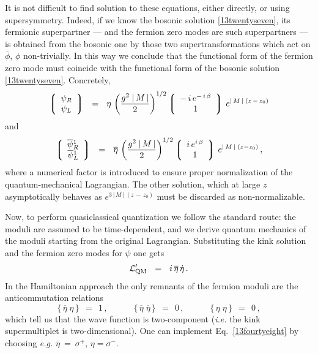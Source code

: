\documentclass[epsfig,12pt]{article}
\def\beq{\begin{equation}}
\def\eeq{\end{equation}}
\def\beq{\begin{equation}}
\def\eeq{\end{equation}}
\newcommand{\ov}{\overline}
\newcommand{\lgr}{\left\lgroup}
\newcommand{\rgr}{\right\rgroup}
\newcommand{\bpsi}{\ov{\psi}{}}
\newcommand{\bphi}{\ov{\phi}{}}
\begin{document}
	It is not difficult to find solution to these 
	equations, either directly, or using supersymmetry.
	Indeed, if we know the bosonic solution \eqref{13twentyseven},
	its fermionic superpartner --- and the fermion zero modes are such 
	superpartners --- is obtained from the
	bosonic one by those two supertransformations which act on
	$ \bphi $, $ \phi $ non-trivially.
	In this way we conclude that the
	functional form of the fermion zero mode 
	must coincide  with the functional form of the bosonic  
	solution \eqref{13twentyseven}. 
	Concretely,
\beq
	\lgr
		\begin{array}{c}
			\psi_R  \\  
			\psi_L
		\end{array}
	\rgr  ~~=~~ 
	\eta \,
	\left( \frac{g^2\; |\, M\,|}{2} \right)^{1/2}
	\lgr 
		\begin{array}{c}
			-\,i\,e^{-\,i\,\beta}  \\
			1
		\end{array}
	\rgr  \,e^{|\, M \,|\; (z \,-\, z_0)}
\label{13fourtyfive}
\eeq
	and
 \beq
	\lgr
		\begin{array}{c}
			\bpsi_R^1  \\
			\bpsi_L^1
		\end{array}
	\rgr  ~~=~~  
	\ov{\eta}\, \left( \frac{g^2\; |\, M \,|}{2} \right)^{1/2} 
	\lgr
		\begin{array}{c}
			i\, e^{i\, \beta}  \\
			1
		\end{array}
	\rgr  \,e^{|\, M \,|\; (z-z_0)}\,,
\label{13fourtysix}
\eeq
	where a numerical factor is introduced to ensure proper
	normalization of the quantum-mechanical Lagrangian.
	The other solution, which at large $ z $ asymptotically behaves
	as $ e^{3\, |\, M \,|\; (z \,-\, z_0)} $ must be discarded as non-normalizable.

	Now, to
	perform   quasiclassical quantization we follow the standard route:
	the moduli are assumed to be   time-dependent, and we derive 
	quantum mechanics of the moduli starting from the original Lagrangian.
	Substituting the kink solution and the fermion zero modes for
	$ \psi $ one gets
\beq
	{\cal L}'_{\rm QM}  ~~=~~ i\, \ov{\eta}\, \dot\eta\,.
\label{13fourtyseven}
\eeq
	In the Hamiltonian approach the only remnants of the fermion moduli
	are the anticommutation relations
\beq
	\{\, \ov{\eta}\; \eta \,\}  ~~=~~  1\,,\qquad\quad
	\{\, \ov{\eta}\; \ov{\eta} \,\}  ~~=~~  0\,,\qquad\quad 
	\{\, \eta\; \eta \,\}  ~~=~~  0\,,
\label{13fourtyeight}
\eeq
	which tell us that the wave function is two-component
	({\it i.e.} the kink supermultiplet is two-dimensional). 
	One can implement Eq.~\eqref{13fourtyeight} by choosing {\it e.g.} 
	$ \ov{\eta} ~=~ \sigma^+ $, $ \eta=\sigma^- $.
\end{document}
